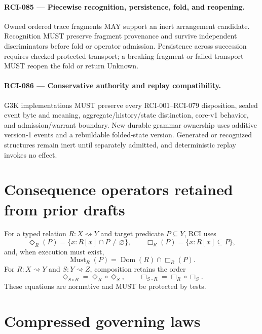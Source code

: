 \documentclass[11pt]{article}
\begin{document}
\paragraph{RCI-085 --- Piecewise recognition, persistence, fold, and reopening.}
Owned ordered trace fragments MAY support an inert arrangement candidate. Recognition
MUST preserve fragment provenance and survive independent discriminators before fold or
operator admission. Persistence across succession requires checked protected transport;
a breaking fragment or failed transport MUST reopen the fold or return Unknown.

\paragraph{RCI-086 --- Conservative authority and replay compatibility.}
G3K implementations MUST preserve every RCI-001--RCI-079 disposition, sealed event byte
and meaning, aggregate/history/state distinction, core-v1 behavior, and admission/warrant
boundary. New durable grammar ownership uses additive version-1 events and a rebuildable
folded-state version. Generated or recognized structures remain inert until separately
admitted, and deterministic replay invokes no effect.

\section{Consequence operators retained from prior drafts}

For a typed relation \(R:X\rightsquigarrow Y\) and target predicate
\(P\subseteq Y\), RCI uses
\[
 \Diamond_R(P)=\{x:R[x]\cap P\neq\varnothing\},\qquad
 \Box_R(P)=\{x:R[x]\subseteq P\},
\]
and, when execution must exist,
\[
 \operatorname{Must}_R(P)=\operatorname{Dom}(R)\cap\Box_R(P).
\]
For \(R:X\rightsquigarrow Y\) and \(S:Y\rightsquigarrow Z\), composition
retains the order
\[
 \Diamond_{S\circ R}=\Diamond_R\circ\Diamond_S,\qquad
 \Box_{S\circ R}=\Box_R\circ\Box_S.
\]
These equations are normative and MUST be protected by tests.

\section{Compressed governing laws}
\end{document}
